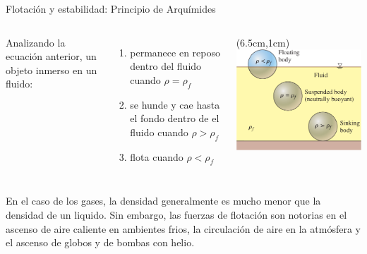 \documentclass [xcolor=svgnames, t] {beamer}
\begin{document}
\begin{frame}{Flotaci\'on y estabilidad: Principio de Arqu\'imides}
\begin{columns}
Analizando la ecuaci\'on anterior, un objeto inmerso en un fluido: 
\begin{enumerate}
\item permanece en reposo dentro del fluido cuando $\rho = \rho_f$
\item se hunde y cae hasta el fondo dentro de el fluido cuando $\rho > \rho_f$ 
\item flota cuando $\rho < \rho_f$
\end{enumerate}
\begin{textblock*}{6cm}(6.5cm,1cm) %
\includegraphics[width=\textwidth]{flota2}
\end{textblock*}
\end{columns}
\vspace{0.5cm}
En el caso de los gases, la densidad generalmente es mucho menor que la densidad de un liquido. Sin embargo, las fuerzas de flotaci\'on son notorias en el ascenso de aire caliente en ambientes frios, la circulaci\'on de aire en la atm\'osfera y el ascenso de globos y de bombas con helio. 
\end{frame}
\end{document}
